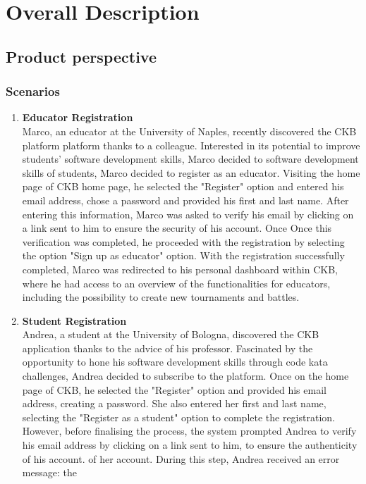 \section{Overall Description}\label{intro}
\subsection{Product perspective}
\subsubsection{Scenarios}
\begin{enumerate}[label=\textbf{\Alph*}.]
    \item  \textbf{Educator Registration} \\
    Marco, an educator at the University of Naples, recently discovered the CKB platform
platform thanks to a colleague. Interested in its potential to improve students' software development skills, Marco decided to
software development skills of students, Marco decided to register as an educator. Visiting the home page of
CKB home page, he selected the "Register" option and entered his email address, chose a password
and provided his first and last name. After entering this information, Marco was asked to
verify his email by clicking on a link sent to him to ensure the security of his account. Once
Once this verification was completed, he proceeded with the registration by selecting the option "Sign up
as educator" option. With the registration successfully completed, Marco was redirected to his
personal dashboard within CKB, where he had access to an overview of the functionalities
for educators, including the possibility to create new tournaments and battles.
\item  \textbf{Student Registration} \\
Andrea, a student at the University of Bologna, discovered the CKB application thanks to the advice
of his professor. Fascinated by the opportunity to hone his software development skills
through code kata challenges, Andrea decided to subscribe to the platform. Once on the home
page of CKB, he selected the "Register" option and provided his email address, creating a
password. She also entered her first and last name, selecting the "Register as a student" option
to complete the registration. However, before finalising the process, the system prompted
Andrea to verify his email address by clicking on a link sent to him, to ensure the authenticity of his account.
of her account. During this step, Andrea received an error message: the

\end{enumerate}
